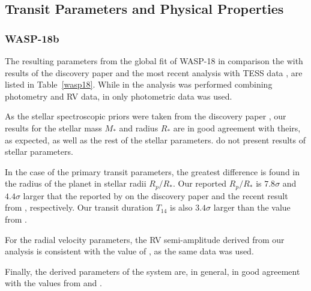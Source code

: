 \subsection{Transit Parameters and Physical Properties}\label{transitparams}

\subsubsection{WASP-18b}

The resulting parameters from the global fit of WASP-18 in comparison the with results of the discovery paper \cite{Hellier2009} and the most recent analysis with TESS data \citep{Shporer2018}, are listed in Table~\ref{wasp18}. While in \cite{Hellier2009} the analysis was performed combining photometry and RV data, in \cite{Shporer2018} only photometric data was used. 

As the stellar spectroscopic priors were taken from the discovery paper \cite{Hellier2009}, our results for the stellar mass $M_*$ and radius $R_*$ are in good agreement with theirs, as expected, as well as the rest of the stellar parameters. \cite{Shporer2018} do not present results of stellar parameters.

In the case of the primary transit parameters, the greatest difference is found in the radius of the planet in stellar radii $R_{p}/R_{*}$. Our reported $R_{p}/R_{*}$ is $7.8\sigma$ and $4.4\sigma$ larger that the reported by \cite{Hellier2009} on the discovery paper and the recent result from \cite{Shporer2018}, respectively.  Our transit duration $T_{14}$ is also $3.4\sigma$ larger than the value from \cite{Hellier2009}.

For the radial velocity parameters, the RV semi-amplitude derived from our analysis is consistent with the value of \cite{Hellier2009}, as the same data was used. 

Finally, the derived parameters of the system are, in general, in good agreement with the values from \cite{Hellier2009} and \cite{Shporer2018}. 

